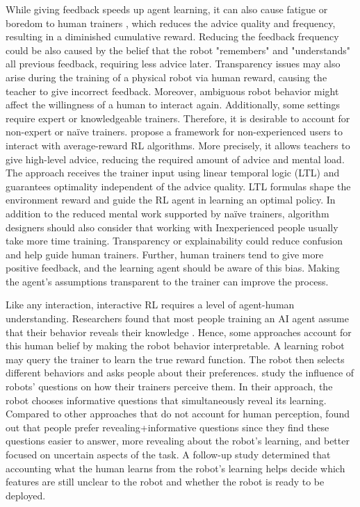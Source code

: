 \documentclass[twoside,11pt]{article}
\begin{document}
While giving feedback speeds up agent learning, it can also cause fatigue or boredom to human trainers \citep{akalin:21}, which reduces the advice quality and frequency, resulting in a diminished cumulative reward. Reducing the feedback frequency could be also caused by the belief that the robot "remembers" and "understands" all previous feedback, requiring less advice later. Transparency issues may also arise during the training of a physical robot via human reward, causing the teacher to give incorrect feedback. Moreover, ambiguous robot behavior might affect the willingness of a human to interact again. Additionally, some settings require expert or knowledgeable trainers. Therefore, it is desirable to account for non-expert or na\"ive trainers. \cite{jiang:21} propose a framework for non-experienced users to interact with average-reward RL algorithms. More precisely, it allows teachers to give high-level advice, reducing the required amount of advice and mental load. The approach receives the trainer input using linear temporal logic (LTL) and guarantees optimality independent of the advice quality. LTL formulas shape the environment reward and guide the RL agent in learning an optimal policy. In addition to the reduced mental work supported by na\"ive trainers, algorithm designers should also consider that working with Inexperienced people usually take more time training. Transparency or explainability could reduce confusion and help guide human trainers. Further, human trainers tend to give more positive feedback, and the learning agent should be aware of this bias. Making the agent's assumptions transparent to the trainer can improve the process.

Like any interaction, interactive RL requires a level of agent-human understanding. Researchers found that most people training an AI agent assume that their behavior reveals their knowledge \citep{habibian:21}. Hence, some approaches account for this human belief by making the robot behavior interpretable. A learning robot may query the trainer to learn the true reward function. The robot then selects different behaviors and asks people about their preferences. \cite{habibian:21} study the influence of robots' questions on how their trainers perceive them. In their approach, the robot chooses informative questions that simultaneously reveal its learning. Compared to other approaches that do not account for human perception, \cite{habibian:21} found out that people prefer revealing+informative questions since they find these questions easier to answer, more revealing about the robot's learning, and better focused on uncertain aspects of the task. A follow-up study determined that accounting what the human learns from the robot's learning helps decide which features are still unclear to the robot and whether the robot is ready to be deployed. 
\end{document}
